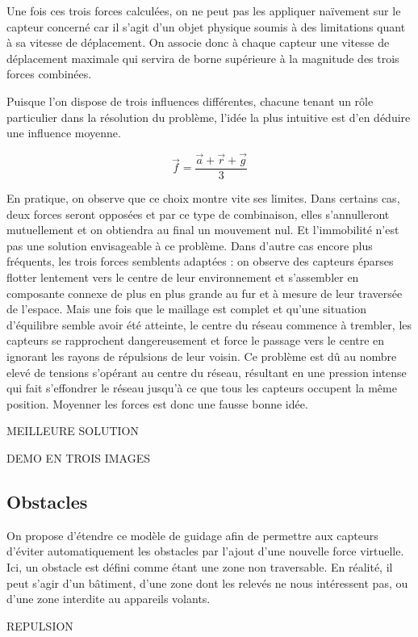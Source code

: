 \documentclass[10pt]{article}
\begin{document}
\begin{multicols}{2}
Une fois ces trois forces calculées, on ne peut pas les appliquer
naïvement sur le capteur concerné car il s'agit d'un objet physique
soumis à des limitations quant à sa vitesse de déplacement. On associe
donc à chaque capteur une vitesse de déplacement maximale qui servira
de borne supérieure à la magnitude des trois forces combinées.

Puisque l'on dispose de trois influences différentes, chacune tenant
un rôle particulier dans la résolution du problème, l'idée la plus
intuitive est d'en déduire une influence moyenne.

$$
\vec{f} = \frac{\vec{a} + \vec{r} + \vec{g}}{3}
$$

En pratique, on observe que ce choix montre vite ses limites. Dans
certains cas, deux forces seront opposées et par ce type de
combinaison, elles s'annulleront mutuellement et on obtiendra au final
un mouvement nul. Et l'immobilité n'est pas une solution envisageable
à ce problème. Dans d'autre cas encore plus fréquents, les trois
forces semblents adaptées : on observe des capteurs éparses flotter
lentement vers le centre de leur environnement et s'assembler en
composante connexe de plus en plus grande au fur et à mesure de leur
traversée de l'espace. Mais une fois que le maillage est complet et
qu'une situation d'équilibre semble avoir été atteinte, le centre du
réseau commence à trembler, les capteurs se rapprochent dangereusement
et force le passage vers le centre en ignorant les rayons de
répulsions de leur voisin. Ce problème est dû au nombre elevé de
tensions s'opérant au centre du réseau, résultant en une pression
intense qui fait s'effondrer le réseau jusqu'à ce que tous les
capteurs occupent la même position. Moyenner les forces est donc une
fausse bonne idée.

MEILLEURE SOLUTION

DEMO EN TROIS IMAGES

\subsection*{Obstacles}

On propose d'étendre ce modèle de guidage afin de permettre aux
capteurs d'éviter automatiquement les obstacles par l'ajout d'une
nouvelle force virtuelle. Ici, un obstacle est défini comme étant une
zone non traversable. En réalité, il peut s'agir d'un bâtiment, d'une
zone dont les relevés ne nous intéressent pas, ou d'une zone interdite
au appareils volants.

REPULSION


\end{multicols}
\end{document}
